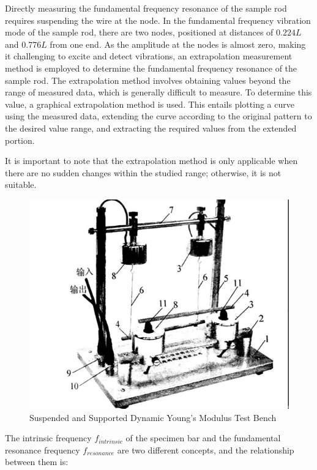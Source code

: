\documentclass[UTF8]{article}
\begin{document}
   Directly measuring the fundamental frequency resonance of the sample rod requires suspending the wire at the node. In the fundamental frequency vibration mode of the sample rod, there are two nodes, positioned at distances of $0.224L$ and $0.776L$ from one end. As the amplitude at the nodes is almost zero, making it challenging to excite and detect vibrations, an extrapolation measurement method is employed to determine the fundamental frequency resonance of the sample rod. The extrapolation method involves obtaining values beyond the range of measured data, which is generally difficult to measure. To determine this value, a graphical extrapolation method is used. This entails plotting a curve using the measured data, extending the curve according to the original pattern to the desired value range, and extracting the required values from the extended portion.
   
   It is important to note that the extrapolation method is only applicable when there are no sudden changes within the studied range; otherwise, it is not suitable.
   
   \begin{figure}[H]
      	    	\centering
      	    	\includegraphics[clip,scale=1,trim={0 0 0 0}]{fig/fig7.png}
      	        \caption{Suspended and Supported Dynamic Young's Modulus Test Bench}
      	        \label{figure.1}
          \end{figure}
       
    The intrinsic frequency $f_{intrinsic}$ of the specimen bar and the fundamental resonance frequency $f_{resonance}$ are two different concepts, and the relationship between them is:
    
\end{document}
